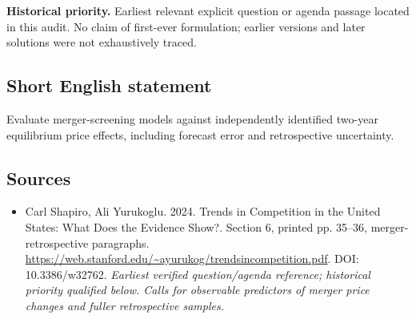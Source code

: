 \documentclass[11pt]{article}
\begin{document}
\par\textbf{Historical priority.} Earliest relevant explicit question or agenda passage located in this audit. No claim of first-ever formulation; earlier versions and later solutions were not exhaustively traced.

\subsection{Short English statement}
Evaluate merger-screening models against independently identified two-year equilibrium price effects, including forecast error and retrospective uncertainty.

\subsection{Sources}
\begin{itemize}\raggedright
\item[\textnormal{[S1]}]\hypertarget{source:30007674:1}{} Carl Shapiro, Ali Yurukoglu. 2024. Trends in Competition in the United States: What Does the Evidence Show?. Section 6, printed pp. 35–36, merger-retrospective paragraphs.
\url{https://web.stanford.edu/~ayurukog/trendsincompetition.pdf}.
DOI: 10.3386/w32762.
{\small\textit{Earliest verified question/agenda reference; historical priority qualified below. Calls for observable predictors of merger price changes and fuller retrospective samples.}}
\end{itemize}
\end{document}
